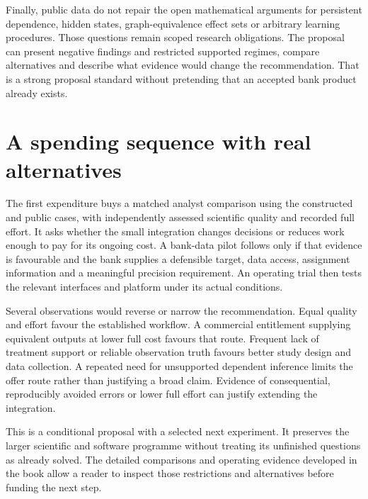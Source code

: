 Finally, public data do not repair the open mathematical arguments for
persistent dependence, hidden states, graph-equivalence effect sets or
arbitrary learning procedures. Those questions remain scoped research
obligations. The proposal can present negative findings and restricted
supported regimes, compare alternatives and describe what evidence would
change the recommendation. That is a strong proposal standard without
pretending that an accepted bank product already exists.




\section{A spending sequence with real alternatives}
The first expenditure buys a matched analyst comparison using the
constructed and public cases, with independently assessed scientific
quality and recorded full effort. It asks whether the small integration
changes decisions or reduces work enough to pay for its ongoing cost.
A bank-data pilot follows only if that evidence is favourable and the
bank supplies a defensible target, data access, assignment information
and a meaningful precision requirement. An operating trial then tests
the relevant interfaces and platform under its actual conditions.

Several observations would reverse or narrow the recommendation. Equal
quality and effort favour the established workflow. A commercial
entitlement supplying equivalent outputs at lower full cost favours
that route. Frequent lack of treatment support or reliable observation
truth favours better study design and data collection. A repeated
need for unsupported dependent inference limits the offer route rather
than justifying a broad claim. Evidence of consequential, reproducibly
avoided errors or lower full effort can justify extending the integration.

This is a conditional proposal with a selected next experiment. It
preserves the larger scientific and software programme without treating
its unfinished questions as already solved. The detailed comparisons
and operating evidence developed in the book allow a reader to inspect those
restrictions and alternatives before funding the next step.



\backmatter
\clearpage{}
{}




